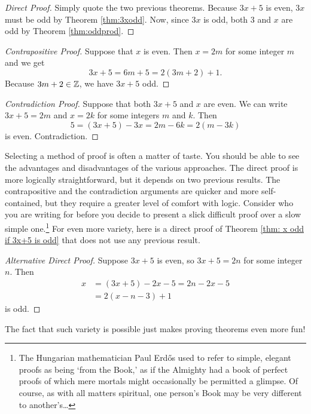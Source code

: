 \begin{proof}[Direct Proof] Simply quote the two previous theorems. Because $3x+5$ is even, $3x$ must be odd by Theorem \ref{thm:3xodd}. Now, since   $3x$ is odd,  both $3$ and $x$ are odd by Theorem \ref{thm:oddprod}.
\end{proof}
 
\begin{proof}[Contrapositive Proof] Suppose that $x$ is even. Then $x=2m$ for some integer $m$ and we get
  \[3x+5=6m+5=2(3m+2)+1.\]
Because $3m+2\in\mathbb{Z}$, we have $3x+5$ odd. 
\end{proof}

\begin{proof}[Contradiction Proof] Suppose that both $3x+5$ and $x$ are even. We can write $3x+5=2m$  and $x=2k$ for some integers $m$ and $k$. Then
  \[5= (3x+5)-3x = 2m - 6k=2(m-3k)\]
  is even. Contradiction.
\end{proof}

 Selecting a method of proof is often a matter of taste. You should be able to see the advantages and disadvantages of the various approaches. The direct proof is more logically straightforward, but it depends on two previous results. The contrapositive and the contradiction arguments are quicker and more self-contained, but they require a greater level of comfort with logic. Consider who you are writing for before you decide to present a slick difficult proof over a slow simple one.\footnote{The Hungarian mathematician Paul Erdős used to refer to simple, elegant proofs as being `from the Book,' as if the Almighty had a book of perfect proofs of which mere mortals might occasionally be permitted a glimpse. Of course, as with all matters spiritual, one person's Book may be very different to another's\ldots} For even more variety, here is a direct proof of Theorem \ref{thm: x odd if 3x+5 is odd} that does not use any previous result.

\begin{proof}[Alternative Direct Proof]
Suppose $3x+5$ is even, so $3x+5=2n$ for some integer $n$. Then
\begin{align*}
x&= (3x+5)-2x-5=2n-2x-5\\
&=2(x-n-3)+1
\end{align*}
is odd.
\end{proof} 
The fact that such variety is possible just makes proving theorems even more fun!


